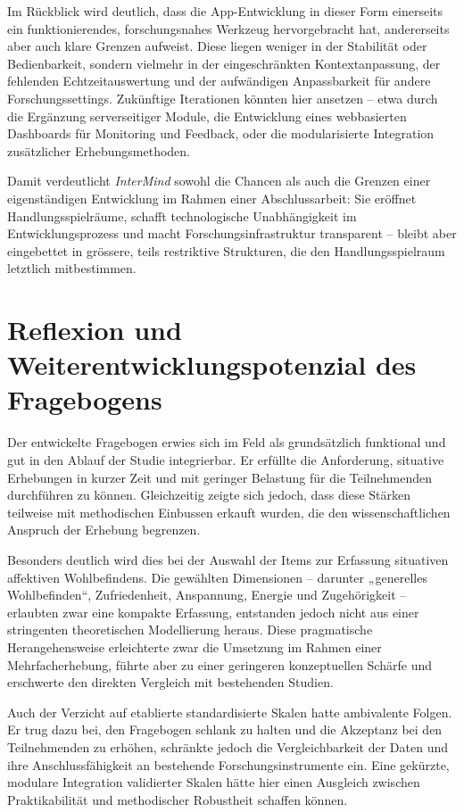 Im Rückblick wird deutlich, dass die App-Entwicklung in dieser Form einerseits ein funktionierendes, forschungsnahes Werkzeug hervorgebracht hat, andererseits aber auch klare Grenzen aufweist. Diese liegen weniger in der Stabilität oder Bedienbarkeit, sondern vielmehr in der eingeschränkten Kontextanpassung, der fehlenden Echtzeitauswertung und der aufwändigen Anpassbarkeit für andere Forschungssettings. Zukünftige Iterationen könnten hier ansetzen -- etwa durch die Ergänzung serverseitiger Module, die Entwicklung eines webbasierten Dashboards für Monitoring und Feedback, oder die modularisierte Integration zusätzlicher Erhebungsmethoden.

Damit verdeutlicht \textit{InterMind} sowohl die Chancen als auch die Grenzen einer eigenständigen Entwicklung im Rahmen einer Abschlussarbeit: Sie eröffnet Handlungsspielräume, schafft technologische Unabhängigkeit im Entwicklungsprozess und macht Forschungsinfrastruktur transparent -- bleibt aber eingebettet in grössere, teils restriktive Strukturen, die den Handlungsspielraum letztlich mitbestimmen.

\section{Reflexion und Weiterentwicklungspotenzial des Fragebogens}

Der entwickelte Fragebogen erwies sich im Feld als grundsätzlich funktional und gut in den Ablauf der Studie integrierbar. Er erfüllte die Anforderung, situative Erhebungen in kurzer Zeit und mit geringer Belastung für die Teilnehmenden durchführen zu können. Gleichzeitig zeigte sich jedoch, dass diese Stärken teilweise mit methodischen Einbussen erkauft wurden, die den wissenschaftlichen Anspruch der Erhebung begrenzen.

Besonders deutlich wird dies bei der Auswahl der Items zur Erfassung situativen affektiven Wohlbefindens. Die gewählten Dimensionen -- darunter „generelles Wohlbefinden“, Zufriedenheit, Anspannung, Energie und Zugehörigkeit -- erlaubten zwar eine kompakte Erfassung, entstanden jedoch nicht aus einer stringenten theoretischen Modellierung heraus. Diese pragmatische Herangehensweise erleichterte zwar die Umsetzung im Rahmen einer Mehrfacherhebung, führte aber zu einer geringeren konzeptuellen Schärfe und erschwerte den direkten Vergleich mit bestehenden Studien.

Auch der Verzicht auf etablierte standardisierte Skalen hatte ambivalente Folgen. Er trug dazu bei, den Fragebogen schlank zu halten und die Akzeptanz bei den Teilnehmenden zu erhöhen, schränkte jedoch die Vergleichbarkeit der Daten und ihre Anschlussfähigkeit an bestehende Forschungsinstrumente ein. Eine gekürzte, modulare Integration validierter Skalen hätte hier einen Ausgleich zwischen Praktikabilität und methodischer Robustheit schaffen können.

